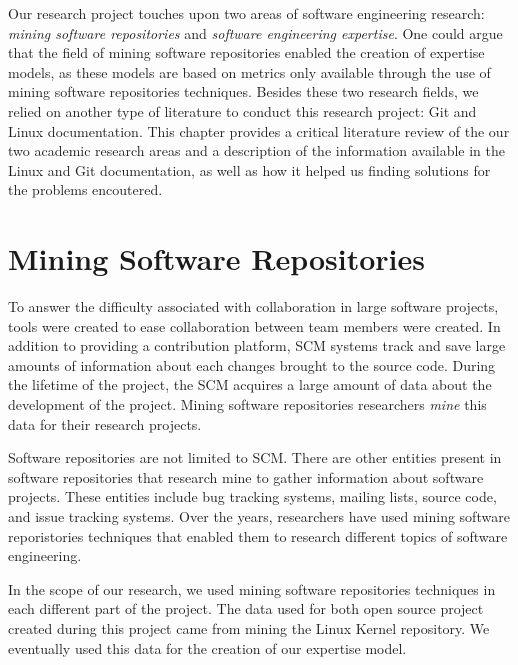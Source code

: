 \label{sec:RevLitt}


Our research project touches upon two areas of software engineering research: \textit{mining software repositories} and \textit{software engineering expertise}. One could argue that the field of mining software repositories enabled the creation of expertise models, as these models are based on metrics only available through the use of mining software repositories techniques. Besides these two research fields, we relied on another type of literature to conduct this research project: Git and Linux documentation. This chapter provides a critical literature review of the our two academic research areas and a description of the information available in the Linux and Git documentation, as well as how it helped us finding solutions for the problems encoutered.



\section{Mining Software Repositories}

To answer the difficulty associated with collaboration in large software projects, tools were created to ease collaboration between team members were created. In addition to providing a contribution platform, \ac{SCM} systems track and save large amounts of information about each changes brought to the source code. During the lifetime of the project, the \ac{SCM} acquires a large amount of data about the development of the project. Mining software repositories researchers \textit{mine} this data for their research projects. 

Software repositories are not limited to \ac{SCM}. There are other entities present in software repositories that research mine to gather information about software projects. These entities include bug tracking systems, mailing lists, source code, and issue tracking systems. Over the years, researchers have used mining software reporistories techniques that enabled them to research different topics of software engineering. 

In the scope of our research, we used mining software repositories techniques in each different part of the project. The data used for both open source project created during this project came from mining the Linux Kernel repository. We eventually used this data for the creation of our expertise model.

